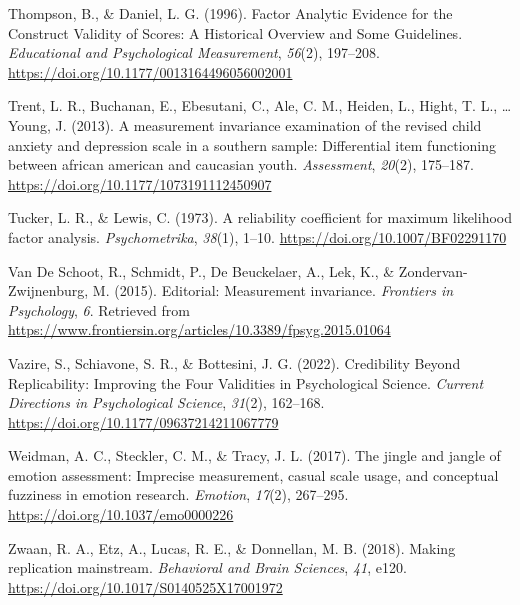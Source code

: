 \documentclass[
  man]{apa6}
\newlength{\cslhangindent}
\newlength{\cslentryspacingunit} %
\newenvironment{CSLReferences}[2] %
 {%
  \setlength{\parindent}{0pt}
  \ifodd #1
  \let\oldpar\par
  \def\par{\hangindent=\cslhangindent\oldpar}
  \fi
  \setlength{\parskip}{#2\cslentryspacingunit}
 }%
 {}
\begin{document}
\begin{CSLReferences}{1}{0}
\leavevmode{}%
Thompson, B., \& Daniel, L. G. (1996). Factor Analytic Evidence for the Construct Validity of Scores: A Historical Overview and Some Guidelines. \emph{Educational and Psychological Measurement}, \emph{56}(2), 197--208. \url{https://doi.org/10.1177/0013164496056002001}

\leavevmode{}%
Trent, L. R., Buchanan, E., Ebesutani, C., Ale, C. M., Heiden, L., Hight, T. L., \ldots{} Young, J. (2013). A measurement invariance examination of the revised child anxiety and depression scale in a southern sample: Differential item functioning between african american and caucasian youth. \emph{Assessment}, \emph{20}(2), 175--187. \url{https://doi.org/10.1177/1073191112450907}

\leavevmode{}%
Tucker, L. R., \& Lewis, C. (1973). A reliability coefficient for maximum likelihood factor analysis. \emph{Psychometrika}, \emph{38}(1), 1--10. \url{https://doi.org/10.1007/BF02291170}

\leavevmode{}%
Van De Schoot, R., Schmidt, P., De Beuckelaer, A., Lek, K., \& Zondervan-Zwijnenburg, M. (2015). Editorial: Measurement invariance. \emph{Frontiers in Psychology}, \emph{6}. Retrieved from \url{https://www.frontiersin.org/articles/10.3389/fpsyg.2015.01064}

\leavevmode{}%
Vazire, S., Schiavone, S. R., \& Bottesini, J. G. (2022). Credibility Beyond Replicability: Improving the Four Validities in Psychological Science. \emph{Current Directions in Psychological Science}, \emph{31}(2), 162--168. \url{https://doi.org/10.1177/09637214211067779}

\leavevmode{}%
Weidman, A. C., Steckler, C. M., \& Tracy, J. L. (2017). The jingle and jangle of emotion assessment: Imprecise measurement, casual scale usage, and conceptual fuzziness in emotion research. \emph{Emotion}, \emph{17}(2), 267--295. \url{https://doi.org/10.1037/emo0000226}

\leavevmode{}%
Zwaan, R. A., Etz, A., Lucas, R. E., \& Donnellan, M. B. (2018). Making replication mainstream. \emph{Behavioral and Brain Sciences}, \emph{41}, e120. \url{https://doi.org/10.1017/S0140525X17001972}

\end{CSLReferences}
\end{document}
